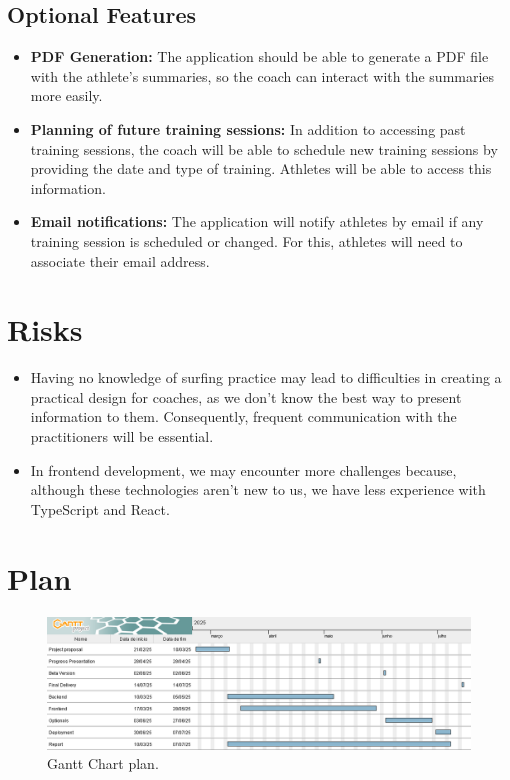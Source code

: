%
%
\subsection{Optional Features} \label{sec123}
\begin{itemize}
\item \textbf{PDF Generation:} The application should be able to generate a PDF file with the athlete's summaries, so the coach can interact with the summaries more easily.
\item \textbf{Planning of future training sessions:} In addition to accessing past training sessions, the coach will be able to schedule new training sessions by providing the date and type of training. Athletes will be able to access this information.
\item \textbf{Email notifications:} The application will notify athletes by email if any training session is scheduled or changed. For this, athletes will need to associate their email address.
\end{itemize}


%
%
\section{Risks} \label{sec13}
\begin{itemize}
\item Having no knowledge of surfing practice may lead to difficulties in creating a practical design for coaches, as we don’t know the best way to present information to them. Consequently, frequent communication with the practitioners will be essential.
\item In frontend development, we may encounter more challenges because, although these technologies aren't new to us, we have less experience with TypeScript and React.
\end{itemize}

%
%
\section{Plan} \label{sec14}
\begin{figure}[h]
\centering
\includegraphics [width=6in]{./figures/GanttChart.png}
\caption{Gantt Chart plan.}
\end{figure}